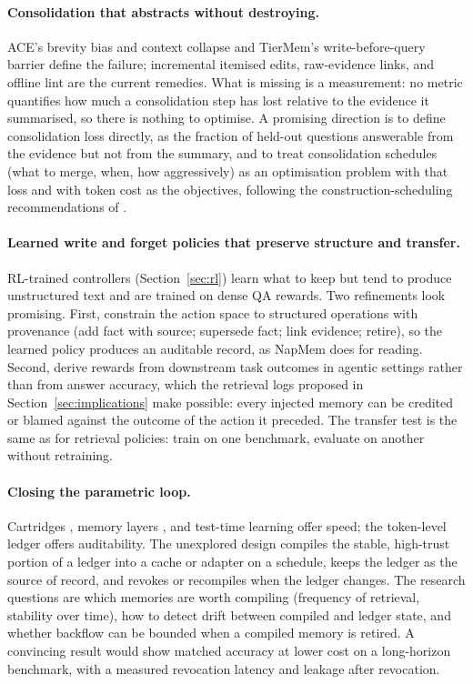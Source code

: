 \documentclass[11pt]{article}
\begin{document}
\paragraph{Consolidation that abstracts without destroying.}
ACE's brevity bias and context collapse \citep{zhang2025ace} and TierMem's write-before-query barrier \citep{zhu2026tiermem} define the failure; incremental itemised edits, raw-evidence links, and offline lint \citep{karpathy2026wiki,fang2025lightmem} are the current remedies. What is missing is a measurement: no metric quantifies how much a consolidation step has lost relative to the evidence it summarised, so there is nothing to optimise. A promising direction is to define consolidation loss directly, as the fraction of held-out questions answerable from the evidence but not from the summary, and to treat consolidation schedules (what to merge, when, how aggressively) as an optimisation problem with that loss and with token cost as the objectives, following the construction-scheduling recommendations of \citet{omri2026systems}.

\paragraph{Learned write and forget policies that preserve structure and transfer.}
RL-trained controllers (Section~\ref{sec:rl}) learn what to keep but tend to produce unstructured text \citep{jiang2026anatomy} and are trained on dense QA rewards. Two refinements look promising. First, constrain the action space to structured operations with provenance (add fact with source; supersede fact; link evidence; retire), so the learned policy produces an auditable record, as NapMem does for reading. Second, derive rewards from downstream task outcomes in agentic settings rather than from answer accuracy, which the retrieval logs proposed in Section~\ref{sec:implications} make possible: every injected memory can be credited or blamed against the outcome of the action it preceded. The transfer test is the same as for retrieval policies: train on one benchmark, evaluate on another without retraining.

\paragraph{Closing the parametric loop.}
Cartridges \citep{eyuboglu2025cartridges}, memory layers \citep{berges2024memorylayers}, and test-time learning \citep{behrouz2024titans} offer speed; the token-level ledger offers auditability. The unexplored design compiles the stable, high-trust portion of a ledger into a cache or adapter on a schedule, keeps the ledger as the source of record, and revokes or recompiles when the ledger changes. The research questions are which memories are worth compiling (frequency of retrieval, stability over time), how to detect drift between compiled and ledger state, and whether backflow \citep{wang2026unlearning} can be bounded when a compiled memory is retired. A convincing result would show matched accuracy at lower cost on a long-horizon benchmark, with a measured revocation latency and leakage after revocation.
\end{document}
